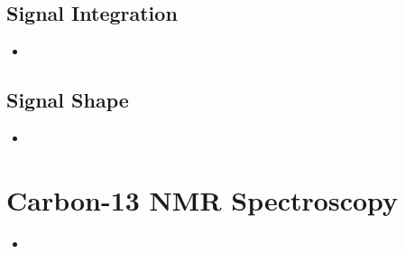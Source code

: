 \begin{itemize}
    \subsection{Signal Integration}\label{Signal Integration}
    \begin{itemize}
        \item 
    \end{itemize}

    \subsection{Signal Shape}\label{Signal Shape}
    \begin{itemize}
        \item 
    \end{itemize}
    
    
\end{itemize}

\section{Carbon-13 NMR Spectroscopy}\label{Carbon-13 NMR Spectroscopy}
\begin{itemize}
    \item 
\end{itemize}